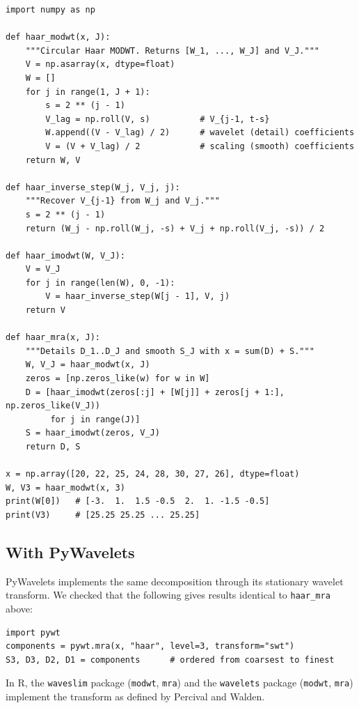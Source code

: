 \documentclass[11pt,a4paper]{article}
\begin{document}
\begin{lstlisting}
import numpy as np

def haar_modwt(x, J):
    """Circular Haar MODWT. Returns [W_1, ..., W_J] and V_J."""
    V = np.asarray(x, dtype=float)
    W = []
    for j in range(1, J + 1):
        s = 2 ** (j - 1)
        V_lag = np.roll(V, s)          # V_{j-1, t-s}
        W.append((V - V_lag) / 2)      # wavelet (detail) coefficients
        V = (V + V_lag) / 2            # scaling (smooth) coefficients
    return W, V

def haar_inverse_step(W_j, V_j, j):
    """Recover V_{j-1} from W_j and V_j."""
    s = 2 ** (j - 1)
    return (W_j - np.roll(W_j, -s) + V_j + np.roll(V_j, -s)) / 2

def haar_imodwt(W, V_J):
    V = V_J
    for j in range(len(W), 0, -1):
        V = haar_inverse_step(W[j - 1], V, j)
    return V

def haar_mra(x, J):
    """Details D_1..D_J and smooth S_J with x = sum(D) + S."""
    W, V_J = haar_modwt(x, J)
    zeros = [np.zeros_like(w) for w in W]
    D = [haar_imodwt(zeros[:j] + [W[j]] + zeros[j + 1:], np.zeros_like(V_J))
         for j in range(J)]
    S = haar_imodwt(zeros, V_J)
    return D, S

x = np.array([20, 22, 25, 24, 28, 30, 27, 26], dtype=float)
W, V3 = haar_modwt(x, 3)
print(W[0])   # [-3.  1.  1.5 -0.5  2.  1. -1.5 -0.5]
print(V3)     # [25.25 25.25 ... 25.25]
\end{lstlisting}

\subsection{With PyWavelets}

PyWavelets implements the same decomposition through its stationary wavelet transform. We checked that the
following gives results identical to \texttt{haar\_mra} above:

\begin{lstlisting}
import pywt
components = pywt.mra(x, "haar", level=3, transform="swt")
S3, D3, D2, D1 = components      # ordered from coarsest to finest
\end{lstlisting}

In R, the \texttt{waveslim} package (\texttt{modwt}, \texttt{mra}) and the \texttt{wavelets} package
(\texttt{modwt}, \texttt{mra}) implement the transform as defined by Percival and Walden.

\end{document}
